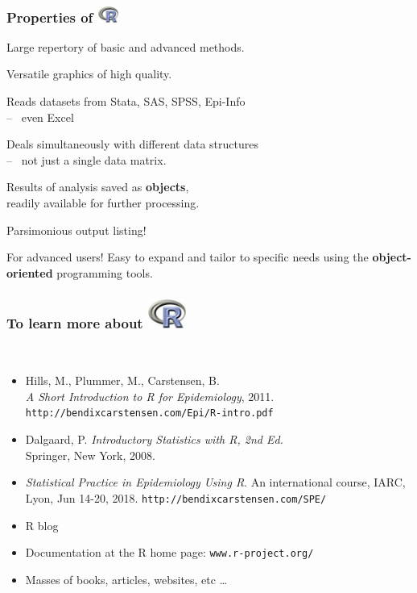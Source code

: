 \documentclass[handout,12pt]{beamer}
\newcommand{\Rlogo}[1]{\includegraphics[#1]{Rlogo}}
\begin{document}
\begin{frame}
\frametitle{Properties of \Rlogo{height=1.2em}}

\pause
\bi
\item Large repertory of basic and advanced methods. \pause\medskip 
\item Versatile graphics of high quality. \pause\medskip 
\item %
 Reads datasets from Stata, SAS, SPSS, Epi-Info\\
 -- \ even Excel \pause\medskip
\item Deals simultaneously with different %
   data structures \\ -- \ not just a single data matrix. \pause\medskip 
\item Results of analysis saved as {\bf objects}, \\ 
     readily available for further processing. \pause\medskip 
\item Parsimonious output listing! \pause\medskip 
\item For advanced users! Easy to expand and tailor to specific needs
    using the \textbf{object-oriented} %
    programming tools. \medskip 
\ei


\end{frame}


\begin{frame}[fragile]
\frametitle{To learn more about \Rlogo{height=2.2em}}
\ \\

\begin{itemize}
\item
Hills, M., Plummer, M., Carstensen, B. \\
{\it A Short Introduction to R for Epidemiology}, 2011.
\small
 \verb|http://bendixcarstensen.com/Epi/R-intro.pdf|
\normalsize

\medskip
\item
Dalgaard, P. {\it Introductory Statistics with R, 2nd Ed.}\\
Springer, New York, 2008.

\pause\medskip
\item
 {\it Statistical Practice in Epidemiology Using R}.  
 An international course, IARC, Lyon, Jun 14-20, 2018.
 \small
\verb|http://bendixcarstensen.com/SPE/|
\normalsize
\item R blog
\small
\pause\medskip
\item
Documentation at the R home page: \verb|www.r-project.org/|

\pause\medskip
\item
Masses of  books, articles, websites, etc \dots
\end{itemize}

\end{frame}
\end{document}

